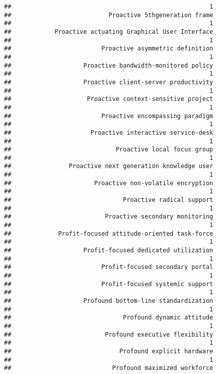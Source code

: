 \documentclass[
]{article}
\begin{document}
\begin{verbatim}
##                                                       1 
##                           Proactive 5thgeneration frame 
##                                                       1 
##            Proactive actuating Graphical User Interface 
##                                                       1 
##                         Proactive asymmetric definition 
##                                                       1 
##                    Proactive bandwidth-monitored policy 
##                                                       1 
##                    Proactive client-server productivity 
##                                                       1 
##                     Proactive context-sensitive project 
##                                                       1 
##                         Proactive encompassing paradigm 
##                                                       1 
##                      Proactive interactive service-desk 
##                                                       1 
##                             Proactive local focus group 
##                                                       1 
##                Proactive next generation knowledge user 
##                                                       1 
##                       Proactive non-volatile encryption 
##                                                       1 
##                               Proactive radical support 
##                                                       1 
##                          Proactive secondary monitoring 
##                                                       1 
##             Profit-focused attitude-oriented task-force 
##                                                       1 
##                    Profit-focused dedicated utilization 
##                                                       1 
##                         Profit-focused secondary portal 
##                                                       1 
##                         Profit-focused systemic support 
##                                                       1 
##                    Profound bottom-line standardization 
##                                                       1 
##                               Profound dynamic attitude 
##                                                       1 
##                          Profound executive flexibility 
##                                                       1 
##                              Profound explicit hardware 
##                                                       1 
##                            Profound maximized workforce 

\end{verbatim}
\end{document}
